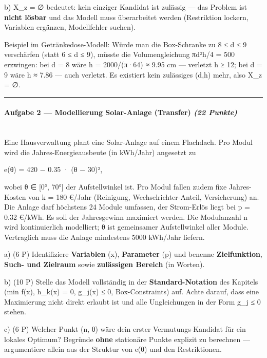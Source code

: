 \documentclass[11pt, a4paper]{article}
\begin{document}
b) X\_z = ∅ bedeutet: kein einziger Kandidat ist zulässig — das Problem ist \textbf{nicht lösbar} und das Modell muss überarbeitet werden (Restriktion lockern, Variablen ergänzen, Modellfehler suchen).


Beispiel im Getränkedose-Modell: Würde man die Box-Schranke zu 8 ≤ d ≤ 9 verschärfen (statt 6 ≤ d ≤ 9), müsste die Volumengleichung πd²h/4 = 500 erzwingen: bei d = 8 wäre h = 2000/(π·64) ≈ 9.95 cm — verletzt h ≥ 12; bei d = 9 wäre h ≈ 7.86 — auch verletzt. Es existiert kein zulässiges (d,h) mehr, also X\_z = ∅.



\noindent\textcolor{rulegray}{\rule{\linewidth}{0.4pt}}


\paragraph{Aufgabe 2 — Modellierung Solar-Anlage (Transfer) \textit{(22 Punkte)}}\mbox{}\\[2pt]

Eine Hausverwaltung plant eine Solar-Anlage auf einem Flachdach. Pro Modul wird die Jahres-Energieausbeute (in kWh/Jahr) angesetzt zu


e(θ) = 420 − 0.35 · (θ − 30)²,


wobei θ ∈ [0°, 70°] der Aufstellwinkel ist. Pro Modul fallen zudem fixe Jahres-Kosten von k = 180 €/Jahr (Reinigung, Wechselrichter-Anteil, Versicherung) an. Die Anlage darf höchstens 24 Module umfassen, der Strom-Erlös liegt bei p = 0.32 €/kWh. Es soll der Jahresgewinn maximiert werden. Die Modulanzahl n wird kontinuierlich modelliert; θ ist gemeinsamer Aufstellwinkel aller Module. Vertraglich muss die Anlage mindestens 5000 kWh/Jahr liefern.


a) (6 P) Identifiziere \textbf{Variablen} (x⃗), \textbf{Parameter} (p⃗) und benenne \textbf{Zielfunktion}, \textbf{Such- und Zielraum} sowie \textbf{zulässigen Bereich} (in Worten).


b) (10 P) Stelle das Modell vollständig in der \textbf{Standard-Notation} des Kapitels (min f(x), h\_k(x) = 0, g\_j(x) ≤ 0, Box-Constraints) auf. Achte darauf, dass eine Maximierung nicht direkt erlaubt ist und alle Ungleichungen in der Form g\_j ≤ 0 stehen.


c) (6 P) Welcher Punkt (n, θ) wäre dein erster Vermutungs-Kandidat für ein lokales Optimum? Begründe \textbf{ohne} stationäre Punkte explizit zu berechnen — argumentiere allein aus der Struktur von e(θ) und den Restriktionen.
\end{document}
